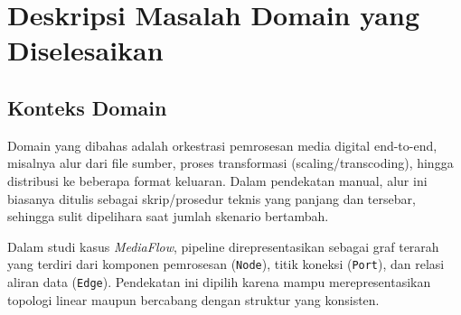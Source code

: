 \section{Deskripsi Masalah Domain yang Diselesaikan}

\subsection{Konteks Domain}

Domain yang dibahas adalah orkestrasi pemrosesan media digital end-to-end, misalnya alur dari file sumber, proses transformasi (scaling/transcoding), hingga distribusi ke beberapa format keluaran. Dalam pendekatan manual, alur ini biasanya ditulis sebagai skrip/prosedur teknis yang panjang dan tersebar, sehingga sulit dipelihara saat jumlah skenario bertambah.

Dalam studi kasus \textit{MediaFlow}, pipeline direpresentasikan sebagai graf terarah yang terdiri dari komponen pemrosesan (\texttt{Node}), titik koneksi (\texttt{Port}), dan relasi aliran data (\texttt{Edge}). Pendekatan ini dipilih karena mampu merepresentasikan topologi linear maupun bercabang dengan struktur yang konsisten.

